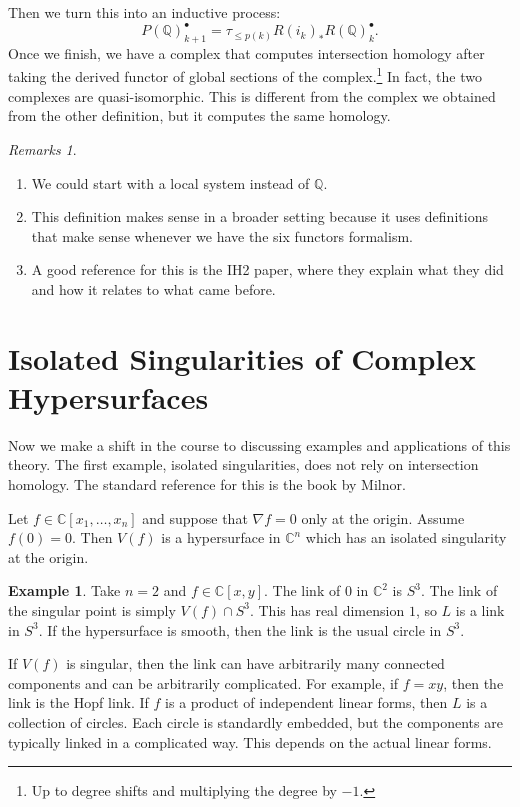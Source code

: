 \documentclass[leqno, openany]{memoir}
\theoremstyle{definition}
\newtheorem{exm}[thm]{Example}
\theoremstyle{remark}
\newtheorem{rmks}[thm]{Remarks}
\theoremstyle{plain}
\theoremstyle{definition}
\theoremstyle{remark}
\newcommand{\C}{\mathbb{C}}
\newcommand{\Q}{\mathbb{Q}}
\begin{document}
Then we turn this into an inductive process:
\[ P(\Q)_{k+1}^{\bullet} = \tau_{\leq p(k)} R (i_k)_* R(\Q)_k^{\bullet}. \]
Once we finish, we have a complex that computes intersection homology after taking the derived functor of global sections of the complex.\footnote{Up to degree shifts and multiplying the degree by $-1$.} In fact, the two complexes are quasi-isomorphic. This is different from the complex we obtained from the other definition, but it computes the same homology.

\begin{rmks}
    \begin{enumerate}
        \item We could start with a local system instead of $\Q$.
        \item This definition makes sense in a broader setting because it uses definitions that make sense whenever we have the six functors formalism.
        \item A good reference for this is the IH2 paper, where they explain what they did and how it relates to what came before.
    \end{enumerate}
\end{rmks}

\section{Isolated Singularities of Complex Hypersurfaces}%
\label{sec:isolated_singularities_of_complex_hypersurfaces}

Now we make a shift in the course to discussing examples and applications of this theory. The first example, isolated singularities, does not rely on intersection homology. The standard reference for this is the book by Milnor.

Let $f \in \C[x_1, \ldots, x_n]$ and suppose that $\nabla f = 0$ only at the origin. Assume $f(0) = 0$. Then $V(f)$ is a hypersurface in $\C^n$ which has an isolated singularity at the origin.

\begin{exm}
    Take $n = 2$ and $f \in \C[x,y]$. The link of $0$ in $\C^2$ is $S^3$. The link of the singular point is simply $V(f) \cap S^3$. This has real dimension $1$, so $L$ is a link in $S^3$. If the hypersurface is smooth, then the link is the usual circle in $S^3$.

    If $V(f)$ is singular, then the link can have arbitrarily many connected components and can be arbitrarily complicated. For example, if $f = xy$, then the link is the Hopf link. If $f$ is a product of independent linear forms, then $L$ is a collection of circles. Each circle is standardly embedded, but the components are typically linked in a complicated way. This depends on the actual linear forms.
\end{exm}
\end{document}
